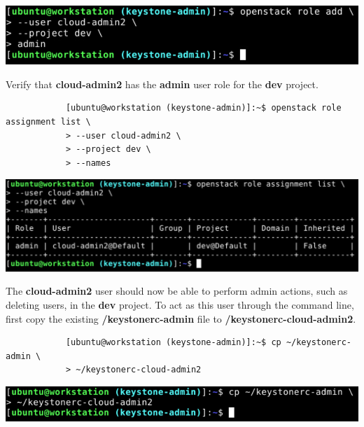 \documentclass[letterpaper, 12pt]{article}
\begin{document}
\begin{enumerate}
\begin{labstep}
        \begin{center}
            \includegraphics[width=\linewidth]{images/appendix/step2.png}
        \end{center}
    \end{labstep}

    \begin{labstep}
        Verify that \textbf{cloud-admin2} has the \textbf{admin} user role for the \textbf{dev} project.
        \begin{lstlisting}
            [ubuntu@workstation (keystone-admin)]:~$ openstack role assignment list \
            > --user cloud-admin2 \
            > --project dev \
            > --names
        \end{lstlisting}

        \begin{center}
            \includegraphics[width=\linewidth]{images/appendix/step3.png}
        \end{center}
    \end{labstep}

    \begin{labstep}
        The \textbf{cloud-admin2} user should now be able to perform admin actions, such as deleting users, in the \textbf{dev} project.
        To act as this user through the command line, first copy the existing \textbf{\texttildemid/keystonerc-admin} file to \textbf{\texttildemid/keystonerc-cloud-admin2}.
        \begin{lstlisting}
            [ubuntu@workstation (keystone-admin)]:~$ cp ~/keystonerc-admin \
            > ~/keystonerc-cloud-admin2
        \end{lstlisting}

        \begin{center}
            \includegraphics[width=\linewidth]{images/appendix/step4.png}
        \end{center}
    \end{labstep}


\end{enumerate}
\end{document}
